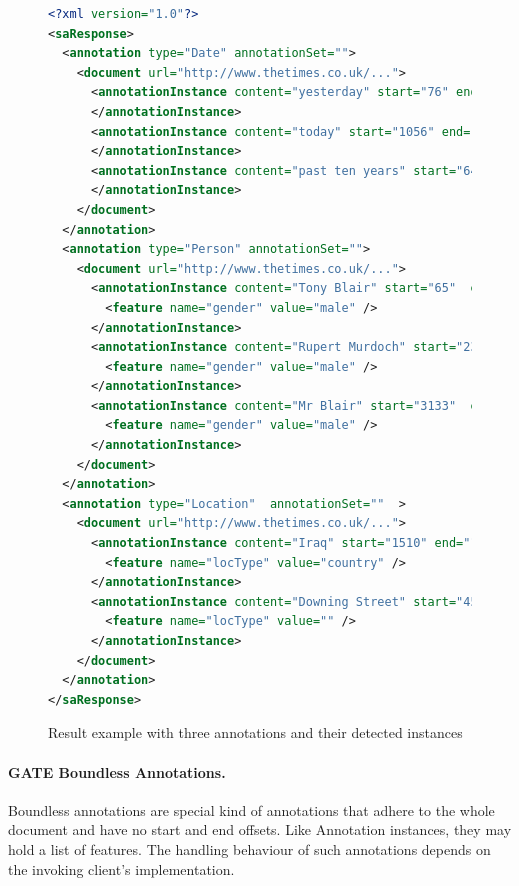 \begin{figure}[htb]
\begin{lstlisting}[language=XML,xleftmargin=8mm,columns=flexible]
<?xml version="1.0"?>
<saResponse>
  <annotation type="Date" annotationSet="">
    <document url="http://www.thetimes.co.uk/...">
      <annotationInstance content="yesterday" start="76" end="85">
      </annotationInstance>
      <annotationInstance content="today" start="1056" end="1061">
      </annotationInstance>
      <annotationInstance content="past ten years" start="6477" end="6491">
      </annotationInstance>
    </document>
  </annotation>
  <annotation type="Person" annotationSet="">
    <document url="http://www.thetimes.co.uk/...">
      <annotationInstance content="Tony Blair" start="65"  end="75">
        <feature name="gender" value="male" />
      </annotationInstance>
      <annotationInstance content="Rupert Murdoch" start="2357" end="2371">
        <feature name="gender" value="male" />
      </annotationInstance>
      <annotationInstance content="Mr Blair" start="3133"  end="3141">
        <feature name="gender" value="male" />
      </annotationInstance>
    </document>
  </annotation>
  <annotation type="Location"  annotationSet=""  >
    <document url="http://www.thetimes.co.uk/...">
      <annotationInstance content="Iraq" start="1510" end="1514">
        <feature name="locType" value="country" />
      </annotationInstance>
      <annotationInstance content="Downing Street" start="4576" end="4590">
        <feature name="locType" value="" />
      </annotationInstance>
    </document>
  </annotation>
</saResponse>
\end{lstlisting}
\vspace*{-2mm}
\caption{Result example with three annotations and their detected instances}
\label{list:response2}
\end{figure}

\paragraph{GATE Boundless Annotations.} Boundless annotations are special kind of annotations that adhere to the whole document and have no start and end offsets. Like Annotation instances, they may hold a list of features. The handling behaviour of such annotations depends on the invoking client's implementation.  


